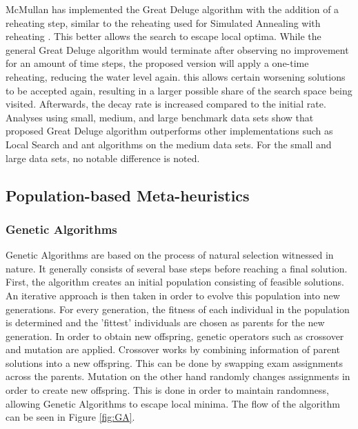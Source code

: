 McMullan \cite{mcmullan2007} has implemented the Great Deluge algorithm with the addition of a reheating step, similar to the reheating used for Simulated Annealing with reheating \cite{Goh2017}. This better allows the search to escape local optima. While the general Great Deluge algorithm would terminate after observing no improvement for an amount of time steps, the proposed version will apply a one-time reheating, reducing the water level again. this allows certain worsening solutions to be accepted again, resulting in a larger possible share of the search space being visited. Afterwards, the decay rate is increased compared to the initial rate. Analyses using small, medium, and large benchmark data sets show that proposed Great Deluge algorithm outperforms other implementations such as Local Search and ant algorithms on the medium data sets. For the small and large data sets, no notable difference is noted.


\subsection{Population-based Meta-heuristics}
\subsubsection{Genetic Algorithms}

Genetic Algorithms \cite{Holland1975} are based on the process of natural selection witnessed in nature. It generally consists of several base steps before reaching a final solution. First, the algorithm creates an initial population consisting of feasible solutions. An iterative approach is then taken in order to evolve this population into new generations. For every generation, the fitness of each individual in the population is determined and the 'fittest' individuals are chosen as parents for the new generation. In order to obtain new offspring, genetic operators such as crossover and mutation are applied. Crossover works by combining information of parent solutions into a new offspring. This can be done by swapping exam assignments across the parents. Mutation on the other hand randomly changes assignments in order to create new offspring. This is done in order to maintain randomness, allowing Genetic Algorithms to escape local minima. The flow of the algorithm can be seen in Figure \ref{fig:GA}.

